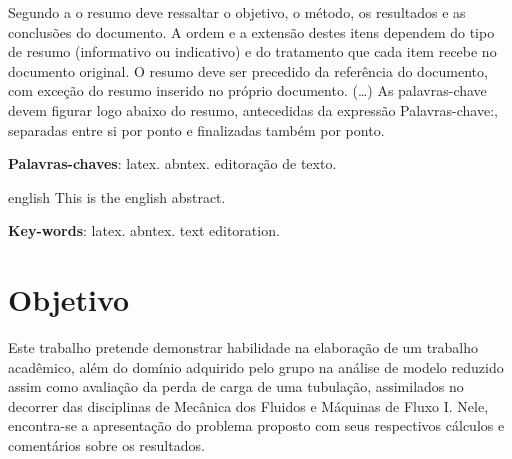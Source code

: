 \documentclass[a4paper, 12pt, openany, oneside, brazil]{abntex2} %
\begin{document}
\frenchspacing

\imprimircapa

\imprimirfolhaderosto


\setlength{\absparsep}{18pt} %
\begin{resumo}
 Segundo a o resumo deve ressaltar o
 objetivo, o método, os resultados e as conclusões do documento. A ordem e a extensão
 destes itens dependem do tipo de resumo (informativo ou indicativo) e do
 tratamento que cada item recebe no documento original. O resumo deve ser
 precedido da referência do documento, com exceção do resumo inserido no
 próprio documento. (\ldots) As palavras-chave devem figurar logo abaixo do
 resumo, antecedidas da expressão Palavras-chave:, separadas entre si por
 ponto e finalizadas também por ponto.

 \textbf{Palavras-chaves}: latex. abntex. editoração de texto.
\end{resumo}

\begin{resumo}[Abstract]
 \begin{otherlanguage*}{english}
   This is the english abstract.

   \vspace{\onelineskip}

   \noindent
   \textbf{Key-words}: latex. abntex. text editoration.
 \end{otherlanguage*}
\end{resumo}

\tableofcontents
\cleardoublepage

\textual

\OnehalfSpacing

\chapter*[Objetivo]{Objetivo}
    Este trabalho pretende demonstrar habilidade na elaboração de um trabalho acadêmico, além do domínio adquirido pelo grupo na análise de modelo reduzido assim como avaliação da perda de carga de uma tubulação, assimilados no decorrer das disciplinas de Mecânica dos Fluidos e Máquinas de Fluxo I. Nele, encontra-se a apresentação do problema proposto com seus respectivos cálculos e comentários sobre os resultados.
\end{document}

